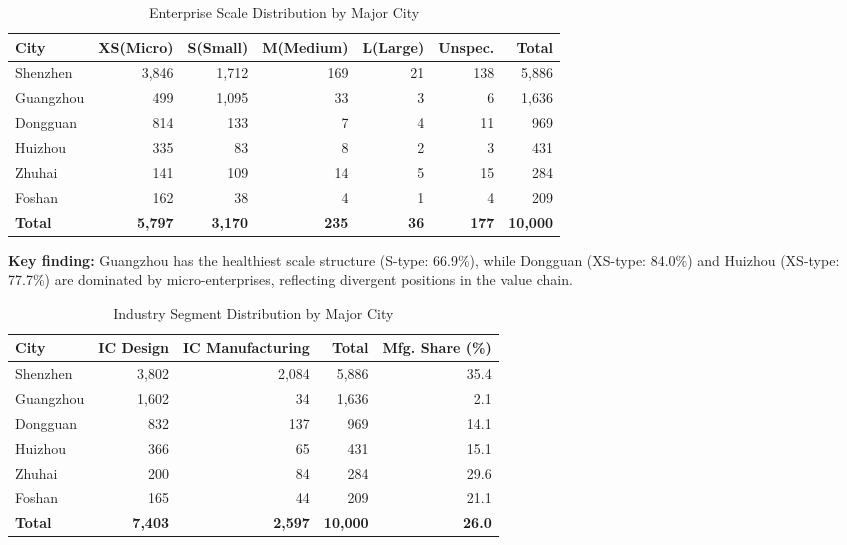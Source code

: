 \documentclass[12pt,a4paper]{article}
\newcommand{\tableHeaderRow}{\rowcolor{tealPrimary}\color{white}}
\newcommand{\tableOddRow}{\rowcolor{mintBG}}
\newcommand{\tableEvenRow}{\rowcolor{white}}
\begin{document}
\begin{table}[H]
\centering
\small
\caption{Enterprise Scale Distribution by Major City}
\label{tab:city_scale}
\begin{tabular}{lrrrrrr}
\toprule
\tableHeaderRow
\textbf{City} & \textbf{XS(Micro)} & \textbf{S(Small)} & \textbf{M(Medium)} & \textbf{L(Large)} & \textbf{Unspec.} & \textbf{Total} \\
\midrule
\tableOddRow  Shenzhen   & 3,846 & 1,712 & 169 & 21 & 138 & 5,886 \\
\tableEvenRow Guangzhou  & 499   & 1,095 & 33  & 3  & 6   & 1,636 \\
\tableOddRow  Dongguan   & 814   & 133   & 7   & 4  & 11  & 969  \\
\tableEvenRow Huizhou    & 335   & 83    & 8   & 2  & 3   & 431  \\
\tableOddRow  Zhuhai     & 141   & 109   & 14  & 5  & 15  & 284  \\
\tableEvenRow Foshan     & 162   & 38    & 4   & 1  & 4   & 209  \\
\midrule
\tableOddRow  \textbf{Total} & \textbf{5,797} & \textbf{3,170} & \textbf{235} & \textbf{36} & \textbf{177} & \textbf{10,000} \\
\bottomrule
\end{tabular}
\end{table}

\textbf{Key finding:} Guangzhou has the healthiest scale structure (S-type: 66.9\%),
while Dongguan (XS-type: 84.0\%) and Huizhou (XS-type: 77.7\%) are dominated by
micro-enterprises, reflecting divergent positions in the value chain.


\begin{table}[H]
\centering
\small
\caption{Industry Segment Distribution by Major City}
\label{tab:city_industry}
\begin{tabular}{lrrrr}
\toprule
\tableHeaderRow
\textbf{City} & \textbf{IC Design} & \textbf{IC Manufacturing} & \textbf{Total} & \textbf{Mfg. Share (\%)} \\
\midrule
\tableOddRow  Shenzhen   & 3,802 & 2,084 & 5,886 & 35.4 \\
\tableEvenRow Guangzhou  & 1,602 & 34    & 1,636 & 2.1  \\
\tableOddRow  Dongguan   & 832   & 137   & 969   & 14.1 \\
\tableEvenRow Huizhou    & 366   & 65    & 431   & 15.1 \\
\tableOddRow  Zhuhai     & 200   & 84    & 284   & 29.6 \\
\tableEvenRow Foshan     & 165   & 44    & 209   & 21.1 \\
\midrule
\tableOddRow  \textbf{Total} & \textbf{7,403} & \textbf{2,597} & \textbf{10,000} & \textbf{26.0} \\
\bottomrule
\end{tabular}
\end{table}
\end{document}
